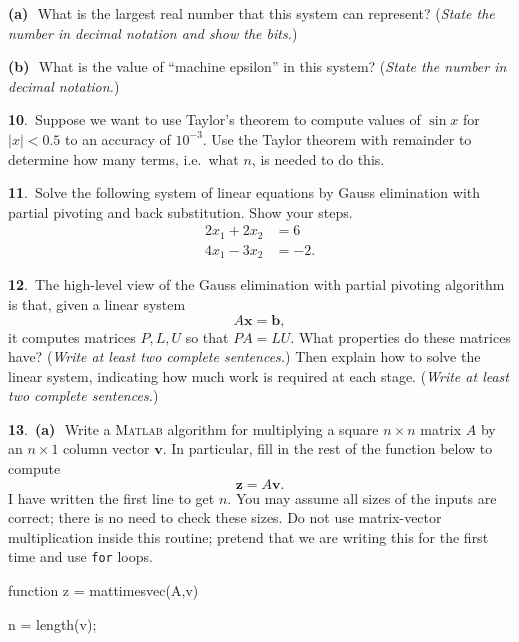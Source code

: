 \documentclass[11pt]{amsart}
\newcommand{\bb}{\mathbf{b}}
\newcommand{\bx}{\mathbf{x}}
\newcommand{\prob}[1]{\bigskip\noindent\large\textbf{#1}.\,\normalsize }
\newcommand{\ppart}[1]{\textbf{(#1)}\,\, }
\newcommand{\epart}[1]{\medskip\noindent\textbf{(#1)}\,\, }
\newcommand{\pts}[1]{}
\newcommand{\Matlab}{\textsc{Matlab}\xspace}
\begin{document}
\epart{a}  What is the largest real number that this system can represent?  (\emph{State the number in decimal notation and show the bits.})
\vspace{1.2in}

\epart{b}  What is the value of ``machine epsilon'' in this system?  (\emph{State the number in decimal notation.})
\vspace{1.2in}

\prob{10} \pts{10}  Suppose we want to use Taylor's theorem to compute values of $\sin x$ for $|x|<0.5$ to an accuracy of $10^{-3}$.  Use the Taylor theorem with remainder to determine how many terms, i.e.~what $n$, is needed to do this.
\vfill

\newpage
\prob{11}  \pts{10}  Solve the following system of linear equations by Gauss elimination with partial pivoting and back substitution.  Show your steps.
\begin{align*}
2 x_1 + 2 x_2 &= 6 \\
4 x_1 - 3 x_2 &= -2.
\end{align*}
\vfill

\prob{12} \pts{10}  The high-level view of the Gauss elimination with partial pivoting algorithm is that, given a linear system 
  $$A \bx = \bb,$$
it computes matrices $P,L,U$ so that $PA=LU$.  What properties do these matrices have?  (\emph{Write at least two complete sentences.})  Then explain how to solve the linear system, indicating how much work is required at each stage.  (\emph{Write at least two complete sentences.})
\vfill

\newpage
\prob{13} \ppart{a} \pts{10}  Write a \Matlab algorithm for multiplying a square $n\times n$ matrix $A$ by an $n\times 1$ column vector $\mathbf{v}$.  In particular, fill in the rest of the function below to compute
  $$\mathbf{z} = A \mathbf{v}.$$
I have written the first line to get $n$.  You may assume all sizes of the inputs are correct; there is no need to check these sizes.  Do not use matrix-vector multiplication inside this routine; pretend that we are writing this for the first time and use \texttt{for} loops.
\begin{mVerb}
function z = mattimesvec(A,v)

n = length(v);
























\end{mVerb}
\end{document}
